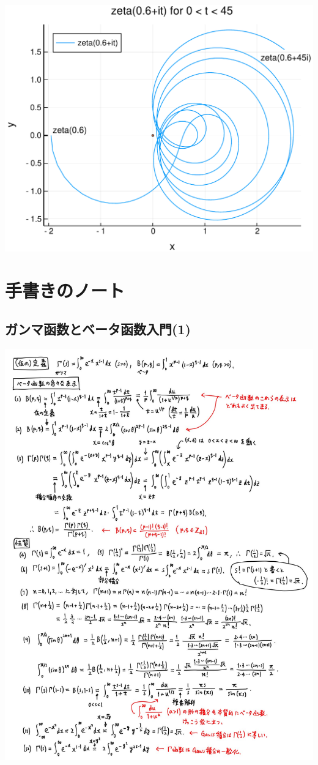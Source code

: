 \documentclass[12pt,a4paper,xelatex,ja=standard]{bxjsarticle}
\begin{document}
\begin{center}
\includegraphics[width=0.8\linewidth]{figures/テスト_9_1.pdf}
\end{center}

\section{手書きのノート}
\subsection{ガンマ函数とベータ函数入門(1)}
\begin{center}
\includegraphics[width=0.8\linewidth]{images/GammaBeta01.jpg}
\end{center}
\end{document}
